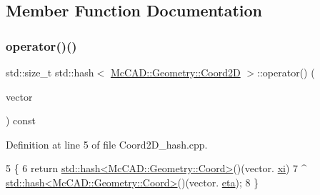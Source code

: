 \subsection{Member Function Documentation}
\mbox{\label{structstd_1_1hash_3_01McCAD_1_1Geometry_1_1Coord2D_01_4_a9441004df077b8b900976e7c16f793b0}} 
\subsubsection{\texorpdfstring{operator()()}{operator()()}\hspace{0.1cm}{\footnotesize\ttfamily [1/2]}}
{\footnotesize\ttfamily std\+::size\+\_\+t std\+::hash$<$ \hyperlink{classMcCAD_1_1Geometry_1_1Coord2D}{Mc\+C\+A\+D\+::\+Geometry\+::\+Coord2D} $>$\+::operator() (\begin{DoxyParamCaption}\item[{const \hyperlink{classMcCAD_1_1Geometry_1_1Coord2D}{Mc\+C\+A\+D\+::\+Geometry\+::\+Coord2D} \&}]{vector }\end{DoxyParamCaption}) const}



Definition at line 5 of file Coord2\+D\+\_\+hash.\+cpp.


\begin{DoxyCode}
5                                                                                            \{
6     \textcolor{keywordflow}{return} \hyperlink{structstd_1_1hash_3_01McCAD_1_1Geometry_1_1Coord_01_4}{std::hash<McCAD::Geometry::Coord>}()(vector.
      \hyperlink{classMcCAD_1_1Geometry_1_1Coord2D_a5b99b9ce570b6bd792bd485fb2f305bb}{xi})
7             ^ \hyperlink{structstd_1_1hash_3_01McCAD_1_1Geometry_1_1Coord_01_4}{std::hash<McCAD::Geometry::Coord>}()(vector.
      \hyperlink{classMcCAD_1_1Geometry_1_1Coord2D_afa71c0967f3d43fe50e61abd731c8f5e}{eta});
8 \}
\end{DoxyCode}
\mbox{\label{structstd_1_1hash_3_01McCAD_1_1Geometry_1_1Coord2D_01_4_a9441004df077b8b900976e7c16f793b0}} 
